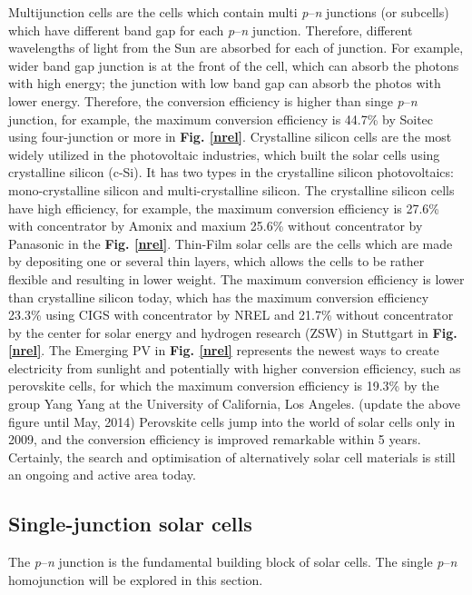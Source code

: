 \documentclass[a4paper, 12pt, titlepage,oneside,drop]{kthesis}
\begin{document}
Multijunction cells are the cells which contain multi \textit{p}--\textit{n} junctions (or subcells) which have different band gap for each \textit{p}--\textit{n} junction.
Therefore, different wavelengths of light from the Sun are absorbed for each of junction. For example, wider band gap junction is at the front of the cell, which can absorb the photons with high energy; the junction with 
low band gap can absorb the photos with lower energy. Therefore, the conversion efficiency is higher than singe \textit{p}--\textit{n} junction, for example, the maximum conversion efficiency is 44.7\% by Soitec using 
four-junction or more in \textbf{Fig. \ref{nrel}}. Crystalline silicon cells are the most widely utilized in the photovoltaic industries, which built the solar cells using crystalline silicon (c-Si). It has two types in
the crystalline silicon photovoltaics: mono-crystalline silicon and multi-crystalline silicon. The crystalline silicon cells have high efficiency, for example, the maximum conversion efficiency is 27.6\% with concentrator 
by Amonix and maxium 25.6\% without concentrator by Panasonic in  the \textbf{Fig. \ref{nrel}}. Thin-Film solar cells are the cells which are made by depositing one or several thin layers, which allows the cells to be rather 
flexible and resulting in lower weight. The maximum conversion efficiency is lower than crystalline silicon today, which has the maximum conversion efficiency 23.3\% using CIGS with concentrator by NREL and 21.7\% without 
concentrator by the center for solar energy and hydrogen research (ZSW) in Stuttgart in \textbf{Fig. \ref{nrel}}. The Emerging PV in \textbf{Fig. \ref{nrel}} represents the newest ways to create electricity from
sunlight and potentially with higher conversion efficiency, such as perovskite cells, for which the maximum conversion efficiency is 19.3\% by the group Yang Yang at the University of California, Los Angeles. 
(update the above figure until May, 2014) Perovskite cells jump into the world of solar cells only in 2009, and the conversion efficiency is improved remarkable within 5 years. Certainly, the search and optimisation 
of alternatively solar cell materials is still an ongoing and active area today.


\subsection{Single-junction solar cells}
The \textit{p}--\textit{n} junction is the fundamental building block of solar cells. The single \textit{p}--\textit{n} homojunction will be explored in this section.
\end{document}

